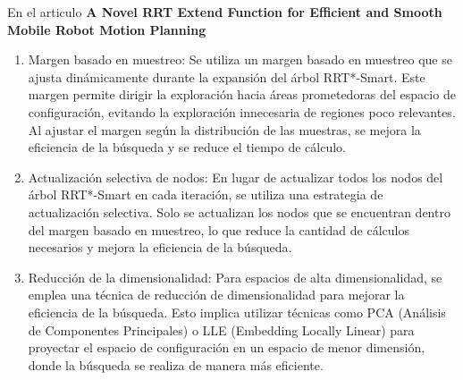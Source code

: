 \documentclass{article}
\begin{document}
\begin{itemize}
 En el articulo \textbf{A Novel RRT Extend Function for Efficient and Smooth Mobile Robot Motion Planning}\\

 \begin{enumerate}
 \item Margen basado en muestreo: Se utiliza un margen basado en muestreo que se ajusta dinámicamente durante la expansión del árbol RRT*-Smart. Este margen permite dirigir la exploración hacia áreas prometedoras del espacio de configuración, evitando la exploración innecesaria de regiones poco relevantes. Al ajustar el margen según la distribución de las muestras, se mejora la eficiencia de la búsqueda y se reduce el tiempo de cálculo.
 \item Actualización selectiva de nodos: En lugar de actualizar todos los nodos del árbol RRT*-Smart en cada iteración, se utiliza una estrategia de actualización selectiva. Solo se actualizan los nodos que se encuentran dentro del margen basado en muestreo, lo que reduce la cantidad de cálculos necesarios y mejora la eficiencia de la búsqueda.
 \item Reducción de la dimensionalidad: Para espacios de alta dimensionalidad, se emplea una técnica de reducción de dimensionalidad para mejorar la eficiencia de la búsqueda. Esto implica utilizar técnicas como PCA (Análisis de Componentes Principales) o LLE (Embedding Locally Linear) para proyectar el espacio de configuración en un espacio de menor dimensión, donde la búsqueda se realiza de manera más eficiente.
 \end{enumerate}
 




\end{itemize}
\end{document}
